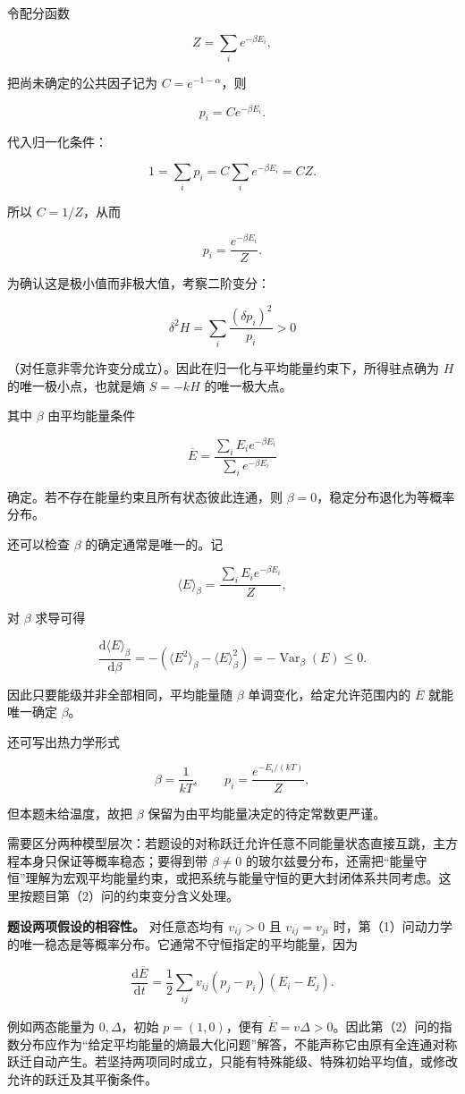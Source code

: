 \documentclass[12pt,a4paper,UTF8]{ctexart}
\begin{document}
令配分函数

\[Z=\sum_i e^{-\beta E_i},\]

把尚未确定的公共因子记为 \(C=e^{-1-\alpha}\)，则

\[p_i=Ce^{-\beta E_i}.\]

代入归一化条件：

\[1=\sum_i p_i
=C\sum_i e^{-\beta E_i}=CZ.\]

所以 \(C=1/Z\)，从而

\[\boxed{p_i=\frac{e^{-\beta E_i}}{Z}}.\]

为确认这是极小值而非极大值，考察二阶变分：

\[\delta^2H=\sum_i\frac{(\delta p_i)^2}{p_i}>0\]

（对任意非零允许变分成立）。因此在归一化与平均能量约束下，所得驻点确为
\(H\) 的唯一极小点，也就是熵 \(S=-kH\) 的唯一极大点。

其中 \(\beta\) 由平均能量条件

\[\overline E=\frac{\sum_iE_ie^{-\beta E_i}}{\sum_i e^{-\beta E_i}}\]

确定。若不存在能量约束且所有状态彼此连通，则
\(\beta=0\)，稳定分布退化为等概率分布。

还可以检查 \(\beta\) 的确定通常是唯一的。记

\[\langle E\rangle_\beta
=\frac{\sum_iE_ie^{-\beta E_i}}{Z},\]

对 \(\beta\) 求导可得

\[\frac{\mathrm d\langle E\rangle_\beta}{\mathrm d\beta}
=-\left(\langle E^2\rangle_\beta-\langle E\rangle_\beta^2\right)
=-\operatorname{Var}_\beta(E)\leq0.\]

因此只要能级并非全部相同，平均能量随 \(\beta\)
单调变化，给定允许范围内的 \(\overline E\) 就能唯一确定 \(\beta\)。

还可写出热力学形式

\[\beta=\frac1{kT},\qquad
p_i=\frac{e^{-E_i/(kT)}}{Z},\]

但本题未给温度，故把 \(\beta\) 保留为由平均能量决定的待定常数更严谨。

需要区分两种模型层次：若题设的对称跃迁允许任意不同能量状态直接互跳，主方程本身只保证等概率稳态；要得到带
\(\beta\neq0\)
的玻尔兹曼分布，还需把``能量守恒''理解为宏观平均能量约束，或把系统与能量守恒的更大封闭体系共同考虑。这里按题目第（2）问的约束变分含义处理。

\textbf{题设两项假设的相容性。} 对任意态均有 \(v_{ij}>0\) 且
\(v_{ij}=v_{ji}\)
时，第（1）问动力学的唯一稳态是等概率分布。它通常不守恒指定的平均能量，因为

\[\frac{\mathrm d\overline E}{\mathrm dt}=\frac12\sum_{ij}v_{ij}(p_j-p_i)(E_i-E_j).\]

例如两态能量为 \(0,\Delta\)，初始 \(p=(1,0)\)，便有
\(\dot{\overline E}=v\Delta>0\)。因此第（2）问的指数分布应作为``给定平均能量的熵最大化问题''解答，不能声称它由原有全连通对称跃迁自动产生。若坚持两项同时成立，只能有特殊能级、特殊初始平均值，或修改允许的跃迁及其平衡条件。
\end{document}
